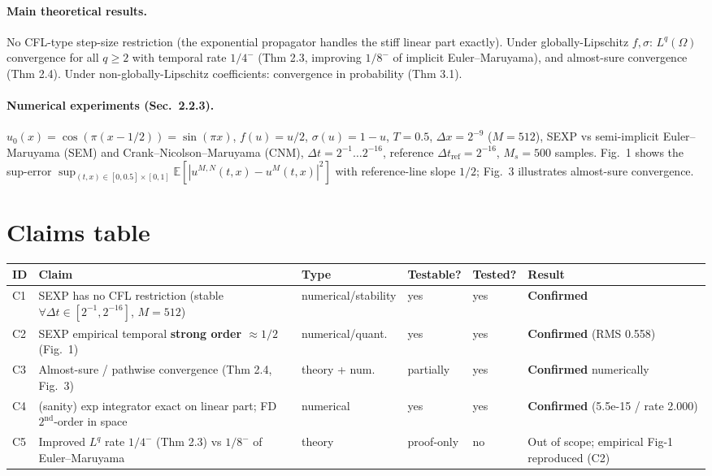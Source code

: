 \documentclass[11pt]{article}
\begin{document}
\paragraph{Main theoretical results.} No CFL-type step-size restriction (the exponential
propagator handles the stiff linear part exactly). Under globally-Lipschitz $f,\sigma$:
$L^q(\Omega)$ convergence for all $q\!\ge\!2$ with temporal rate $1/4^-$ (Thm 2.3, improving
$1/8^-$ of implicit Euler--Maruyama), and almost-sure convergence (Thm 2.4). Under
non-globally-Lipschitz coefficients: convergence in probability (Thm 3.1).

\paragraph{Numerical experiments (Sec.\ 2.2.3).} $u_0(x)=\cos(\pi(x-1/2))=\sin(\pi x)$,
$f(u)=u/2$, $\sigma(u)=1-u$, $T=0.5$, $\Delta x = 2^{-9}$ ($M=512$), SEXP vs semi-implicit
Euler--Maruyama (SEM) and Crank--Nicolson--Maruyama (CNM), $\Delta t = 2^{-1}\dots 2^{-16}$,
reference $\Delta t_{\text{ref}}=2^{-16}$, $M_s=500$ samples. Fig.\ 1 shows the sup-error
$\sup_{(t,x)\in[0,0.5]\times[0,1]}\mathbb{E}[|u^{M,N}(t,x)-u^M(t,x)|^2]$ with reference-line
slope $1/2$; Fig.\ 3 illustrates almost-sure convergence.

\section{Claims table}

\begin{center}
\small
\begin{tabular}{lp{7.5cm}llll}
\toprule
ID & Claim & Type & Testable? & Tested? & Result \\
\midrule
C1 & SEXP has no CFL restriction (stable $\forall\Delta t\!\in\![2^{-1},2^{-16}]$, $M=512$)
   & numerical/stability & yes & yes & \textbf{Confirmed} \\
C2 & SEXP empirical temporal \textbf{strong order $\approx 1/2$} (Fig.\ 1)
   & numerical/quant.\ & yes & yes & \textbf{Confirmed} (RMS 0.558) \\
C3 & Almost-sure / pathwise convergence (Thm 2.4, Fig.\ 3)
   & theory + num.\ & partially & yes & \textbf{Confirmed} numerically \\
C4 & (sanity) exp integrator exact on linear part; FD $2^{\text{nd}}$-order in space
   & numerical & yes & yes & \textbf{Confirmed} (5.5e-15 / rate 2.000) \\
C5 & Improved $L^q$ rate $1/4^-$ (Thm 2.3) vs $1/8^-$ of Euler--Maruyama
   & theory & proof-only & no & Out of scope; empirical Fig-1 reproduced (C2) \\
\bottomrule
\end{tabular}
\end{center}
\end{document}
